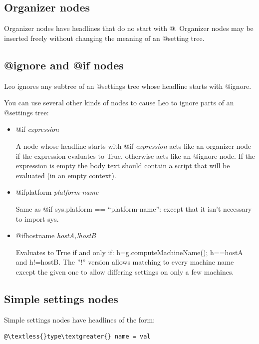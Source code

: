 \documentclass[a4paper,10pt,english]{sphinxmanual}
\begin{document}
\subsection{Organizer nodes}
\label{customizing:organizer-nodes}
Organizer nodes have headlines that do no start with @.
Organizer nodes may be inserted freely without changing the meaning of an @setting tree.


\subsection{@ignore and @if nodes}
\label{customizing:ignore-and-if-nodes}
Leo ignores any subtree of an @settings tree whose headline starts with @ignore.

You can use several other kinds of nodes to cause Leo to ignore parts of  an @settings tree:
\begin{itemize}
\item {} 
@if \emph{expression}

A node whose headline starts with @if \emph{expression} acts like an organizer node if the expression evaluates to True,
otherwise acts like an @ignore node.
If the expression is empty the body text should contain a script that will be evaluated (in an empty context).

\item {} 
@ifplatform \emph{platform-name}

Same as @if sys.platform == ``platform-name'': except that it isn't necessary to import sys.

\item {} 
@ifhostname \emph{hostA,!hostB}

Evaluates to True if and only if: h=g.computeMachineName(); h==hostA and h!=hostB.
The ''!'' version allows matching to every machine name except the given one
to allow differing settings on only a few machines.

\end{itemize}


\subsection{Simple settings nodes}
\label{customizing:simple-settings-nodes}
Simple settings nodes have headlines of the form:

\begin{Verbatim}[commandchars=\\\{\}]
@\textless{}type\textgreater{} name = val
\end{Verbatim}
\end{document}
